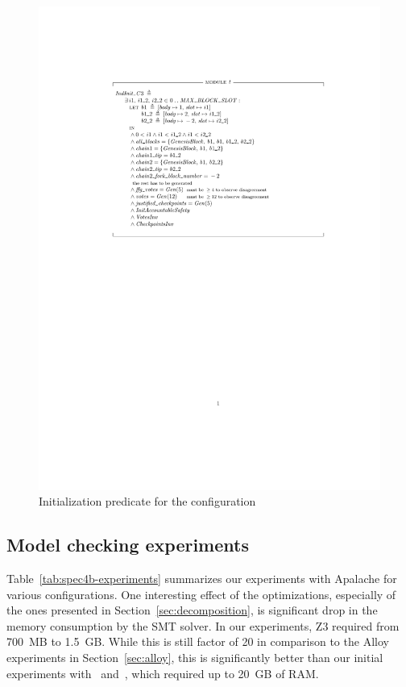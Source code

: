 \begin{figure}
    \includegraphics[width=\textwidth]{images/indinit-c3}
    \caption{Initialization predicate for the
             configuration~}\label{fig:indinit-c3}
\end{figure}

\subsection{Model checking experiments}

Table~\ref{tab:spec4b-experiments} summarizes our experiments with Apalache for
various configurations. One interesting effect of the optimizations,
especially of the ones presented in Section~\ref{sec:decomposition}, is
significant drop in the memory consumption by the SMT solver. In our
experiments, Z3 required from 700~MB to 1.5~GB\@. While this is still factor of
20 in comparison to the Alloy experiments in Section~\ref{sec:alloy}, this is
significantly better than our initial experiments with~\SpecTwo{}
and~\SpecThree{}, which required up to 20~GB of RAM\@.

